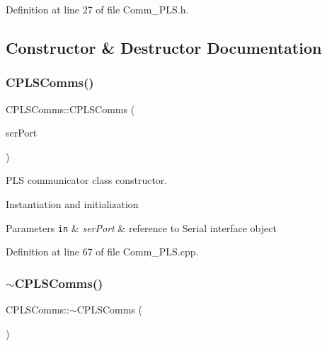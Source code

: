 Definition at line 27 of file Comm\+\_\+\+P\+L\+S.\+h.



\subsection{Constructor \& Destructor Documentation}
\mbox{\label{class_c_p_l_s_comms_ae1ec975e5e402b405389d47b8acd0a63}} 
\subsubsection{\texorpdfstring{C\+P\+L\+S\+Comms()}{CPLSComms()}}
{\footnotesize\ttfamily C\+P\+L\+S\+Comms\+::\+C\+P\+L\+S\+Comms (\begin{DoxyParamCaption}\item[{\mbox{\hyperlink{class_c_serial}{C\+Serial}} \&}]{ser\+Port }\end{DoxyParamCaption})}



P\+LS communicator class constructor. 

Instantiation and initialization 
\begin{DoxyParams}[1]{Parameters}
\mbox{\tt in}  & {\em ser\+Port} & reference to Serial interface object \\
\hline
\end{DoxyParams}


Definition at line 67 of file Comm\+\_\+\+P\+L\+S.\+cpp.

\mbox{\label{class_c_p_l_s_comms_aac23966ff823f63a2ff524bbb706e549}} 
\subsubsection{\texorpdfstring{$\sim$\+C\+P\+L\+S\+Comms()}{~CPLSComms()}}
{\footnotesize\ttfamily C\+P\+L\+S\+Comms\+::$\sim$\+C\+P\+L\+S\+Comms (\begin{DoxyParamCaption}{ }\end{DoxyParamCaption})}



